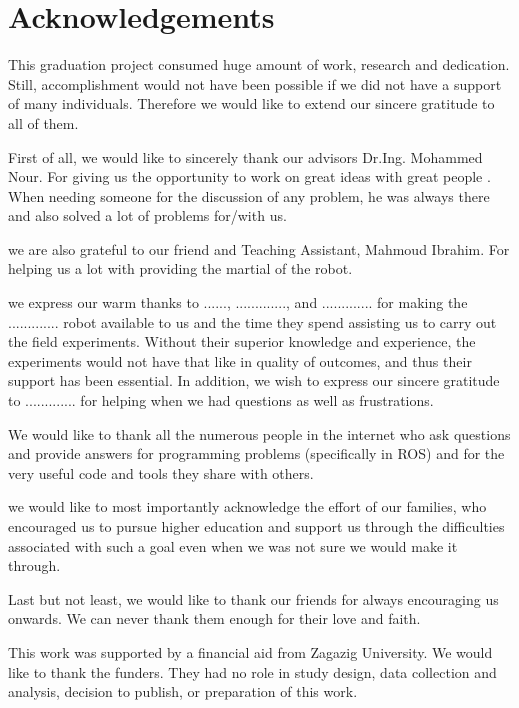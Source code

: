 
\chapter*{Acknowledgements}

This graduation project consumed huge amount of work, research and dedication. Still, accomplishment would not have been possible if we did not have a support of many individuals. Therefore we would like to extend our sincere gratitude to all of them.

First of all, we would like to sincerely thank our advisors Dr.Ing. Mohammed Nour. For giving us the opportunity to work on great ideas with great people . When needing someone for the
discussion of any problem, he was always there and also solved a lot of problems for/with us.



we are also grateful to our friend and Teaching Assistant, Mahmoud Ibrahim. For helping us a lot with providing the martial of the robot.

we express our warm thanks to ......, ............., and ............. for making the ............. robot available to us and the time they spend assisting us to carry out the field experiments. Without their superior knowledge and experience, the experiments would not have that like in quality of outcomes, and thus their support has been essential. In addition, we wish to express our sincere gratitude to ............. for helping when we had questions as well as frustrations.


We would like to thank all the numerous people in the internet who ask questions and provide answers for programming problems (specifically in ROS) and for the very useful code and tools they share with others.

we would like to most importantly acknowledge the effort of our families, who encouraged us to pursue higher education and support us through the difficulties associated with such a goal even when we was not sure we would make it through. 

Last but not least, we would like to thank our friends for always encouraging us onwards. We can
never thank them enough for their love and faith.

This work was supported by a financial aid  from Zagazig University. We would like to thank the funders. They had no role in study design, data collection and analysis, decision to publish, or preparation of this work.
